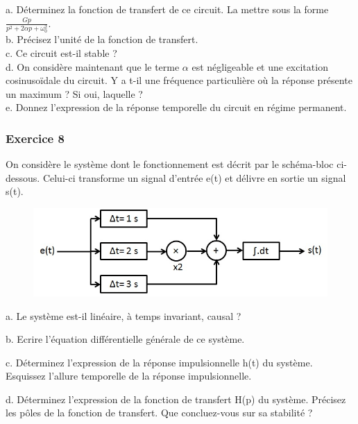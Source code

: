  	a. Déterminez la fonction de transfert de ce circuit. La mettre sous la forme $\frac{Gp}{p^2+2\alpha p+\omega_{0}^{2}}$.\\
 	
 	b. Précisez l'unité de la fonction de transfert. \\
 	
 	c. Ce circuit est-il stable ?\\
 	
 	d. On considère maintenant que le terme $\alpha$ est négligeable et une excitation cosinusoïdale du circuit. Y a t-il une fréquence particulière où la réponse présente un maximum ? Si oui, laquelle ? \\
 	
 	e. Donnez l'expression de la réponse temporelle du circuit en régime permanent.\\
	
	\vspace{1\baselineskip}
	
	\subsubsection{Exercice 8}
	
	On considère le système dont le fonctionnement est décrit par
        le schéma-bloc ci-dessous. Celui-ci transforme un signal
        d'entrée e(t) et délivre en sortie un signal s(t).
	
	\begin{figure}[htbp]
          \centering \includegraphics[scale=0.5]{images/Exo_2_6.jpg}
	\end{figure}
	
	a. Le système est-il linéaire, à temps invariant, causal ?
	
	b. Ecrire l'équation différentielle générale de ce système.
	
	c. Déterminez l'expression de la réponse impulsionnelle h(t)
        du système. Esquissez l'allure temporelle de la réponse
        impulsionnelle.
	
	d. Déterminez l'expression de la fonction de transfert H(p) du
        système. Précisez les pôles de la fonction de transfert. Que
        concluez-vous sur sa stabilité ?
	

	



